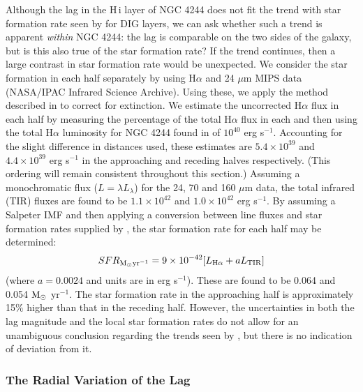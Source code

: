 \documentclass{emulateapj}
\begin{document}
\par
    Although the lag in the {\sc H\,i} layer of NGC 4244 does not fit the trend with star formation rate seen by \citet{2007ApJ...663..933H} for DIG layers, we can ask whether such a trend is apparent {\it within} NGC 4244:  the lag is comparable on the two sides of the galaxy, but is this also true of the star formation rate?  If the \citet{2007ApJ...663..933H} trend continues, then a large contrast in star formation rate would be unexpected. We consider the star formation in each half separately by using H$\alpha$ \citep{1999ApJ...522..669H} and 24 $\mu$m MIPS data (NASA/IPAC Infrared Science Archive).  Using these, we apply the method described in \citet{2009ApJ...703.1672K} to correct for extinction.   We estimate the uncorrected H$\alpha$ flux in each half by measuring the percentage of the total H$\alpha$ flux in each and then using the total H$\alpha$ luminosity for NGC 4244 found in \citet{2008ApJS..178..247K} of $10^{40}$ erg s$^{-1}$.  Accounting for the slight difference in distances used, these estimates are $5.4\times10^{39}$ and $4.4\times10^{39}$ erg s$^{-1}$ in the approaching and receding halves respectively.  (This ordering will remain consistent throughout this section.) Assuming a monochromatic flux ($L={\lambda}L_{\lambda}$) for the 24, 70 and 160 $\mu$m data, the total infrared (TIR) fluxes are found to be $1.1\times10^{42}$ and $1.0\times10^{42}$ erg s$^{-1}$.  By assuming a Salpeter IMF and then applying a conversion between line fluxes and star formation rates supplied by \citet{2007ApJ...671..333K}, the star formation rate for each half may be determined:
\begin{equation}
SFR_{\rm M_{\odot} \rm{ yr}^{-1}}=9\times10^{-42}[L_{\rm H\alpha}+aL_{\rm TIR}]
\end{equation}
(where $a=0.0024$ and units are in erg s$^{-1}$).  These are found to be 0.064 and 0.054 $\textrm M_{\odot}$ yr$^{-1}$. The star formation rate in the approaching half is approximately 15$\%$ higher than that in the receding half.  However, the uncertainties in both the lag magnitude and the local star formation rates do not allow for an unambiguous conclusion regarding the trends seen by \citet{2007ApJ...663..933H}, but there is no indication of deviation from it.

\subsubsection{The Radial Variation of the Lag}\label{Section6.2.2}
\end{document}
